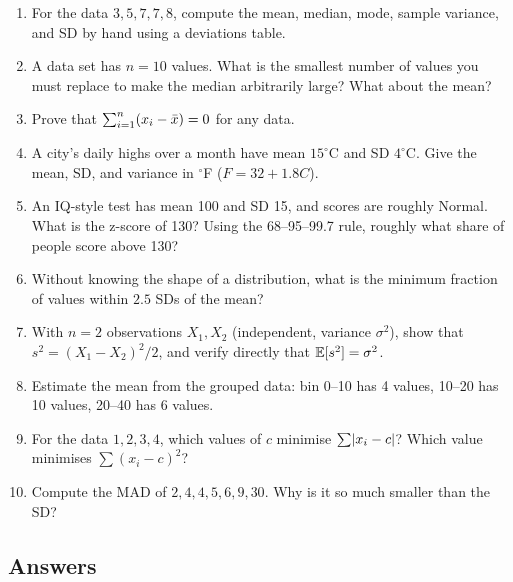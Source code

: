 \begin{enumerate}
  \item For the data $3, 5, 7, 7, 8$, compute the mean, median, mode, sample
  variance, and SD by hand using a deviations table.
  \item A data set has $n=10$ values. What is the smallest number of values you must
  replace to make the median arbitrarily large? What about the mean?
  \item Prove that $\sum_{i=1}^n (x_i - \bar{x}) = 0$ for any data.
  \item A city's daily highs over a month have mean $15^\circ$C and SD $4^\circ$C.
  Give the mean, SD, and variance in $^\circ$F ($F = 32 + 1.8C$).
  \item An IQ-style test has mean 100 and SD 15, and scores are roughly Normal. What
  is the z-score of 130? Using the 68--95--99.7 rule, roughly what share of people
  score above 130?
  \item Without knowing the shape of a distribution, what is the minimum fraction of
  values within $2.5$ SDs of the mean?
  \item With $n=2$ observations $X_1, X_2$ (independent, variance $\sigma^2$), show
  that $s^2 = (X_1 - X_2)^2/2$, and verify directly that $\operatorname{\mathbb{E}}[s^2] = \sigma^2$.
  \item Estimate the mean from the grouped data: bin 0--10 has 4 values, 10--20 has
  10 values, 20--40 has 6 values.
  \item For the data $1, 2, 3, 4$, which values of $c$ minimise $\sum \lvert x_i - c\rvert$?
  Which value minimises $\sum (x_i - c)^2$?
  \item Compute the MAD of $2, 4, 4, 5, 6, 9, 30$. Why is it so much smaller than
  the SD?
\end{enumerate}

\subsection*{Answers}

